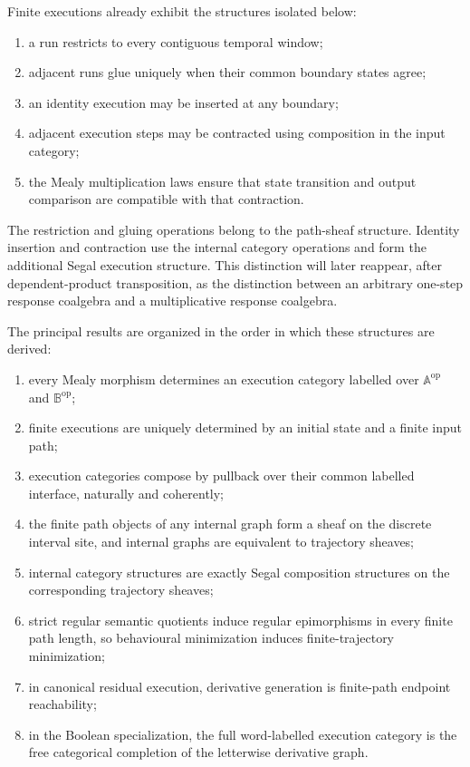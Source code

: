 Finite executions already exhibit the structures isolated below:
\begin{enumerate}
    \item a run restricts to every contiguous temporal window;
    \item adjacent runs glue uniquely when their common boundary states agree;
    \item an identity execution may be inserted at any boundary;
    \item adjacent execution steps may be contracted using composition in the
    input category;
    \item the Mealy multiplication laws ensure that state transition and
    output comparison are compatible with that contraction.
\end{enumerate}

The restriction and gluing operations belong to the path-sheaf structure.
Identity insertion and contraction use the internal category operations and
form the additional Segal execution structure.  This distinction will later
reappear, after dependent-product transposition, as the distinction between
an arbitrary one-step response coalgebra and a multiplicative response
coalgebra.

The principal results are organized in the order in which these structures
are derived:
\begin{enumerate}
    \item every Mealy morphism determines an execution category labelled over
    \(\mathbb A^{\mathrm{op}}\) and \(\mathbb B^{\mathrm{op}}\);
    \item finite executions are uniquely determined by an initial state and a
    finite input path;
    \item execution categories compose by pullback over their common labelled
    interface, naturally and coherently;
    \item the finite path objects of any internal graph form a sheaf on the
    discrete interval site, and internal graphs are equivalent to trajectory
    sheaves;
    \item internal category structures are exactly Segal composition
    structures on the corresponding trajectory sheaves;
    \item strict regular semantic quotients induce regular epimorphisms in
    every finite path length, so behavioural minimization induces
    finite-trajectory minimization;
    \item in canonical residual execution, derivative generation is finite-path
    endpoint reachability;
    \item in the Boolean specialization, the full word-labelled execution
    category is the free categorical completion of the letterwise derivative
    graph.
\end{enumerate}

